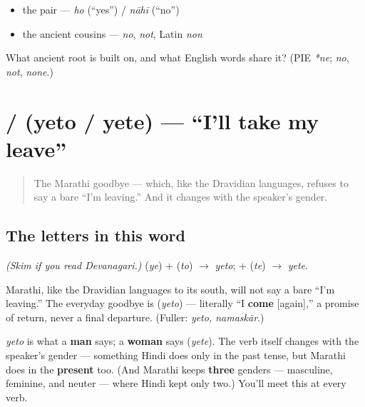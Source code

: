 \begin{itemize}
\raggedright
  \item the pair — \emph{ho} (\textquotedblleft{}yes\textquotedblright{}) / \emph{nāhī} (\textquotedblleft{}no\textquotedblright{})
  \item the ancient cousins — \emph{no}, \emph{not}, Latin \emph{non}
\end{itemize}

\begin{tcolorbox}[breakable,colback=teal!4,colframe=teal!35!black,title={Before you move on}]
What ancient root is \textbf{} built on, and what English words share it? (PIE \emph{*ne}; \emph{no}, \emph{not}, \emph{none}.)
\end{tcolorbox}
\section[yeto / yete]{ /  (yeto / yete) — \textquotedblleft{}I'll take my leave\textquotedblright{}}

\label{lesson:MR-C01-yeto}



\begin{quote}
The Marathi goodbye — which, like the Dravidian languages, refuses to say a bare \textquotedblleft{}I'm leaving.\textquotedblright{} And it changes with the speaker's gender.
\end{quote}

\subsection*{The letters in this word}
\emph{(Skim if you read Devanagari.)} \textbf{} (\emph{ye}) + \textbf{} (\emph{to}) $\to$ \emph{yeto}; \textbf{} + \textbf{} (\emph{te}) $\to$ \emph{yete}.

\begin{cousinweb}
Marathi, like the Dravidian languages to its south, will not say a bare \textquotedblleft{}I'm leaving.\textquotedblright{} The everyday goodbye is \textbf{} (\emph{yeto}) — literally \textquotedblleft{}I \textbf{come} {[}again{]},\textquotedblright{} a promise of return, never a final departure. (Fuller: \emph{yeto, namaskār}.)
\end{cousinweb}

\begin{grammarlens}[title={Grammar Lens: Marathi verbs carry gender}]
\emph{yeto} is what a \textbf{man} says; a \textbf{woman} says \textbf{} (\emph{yete}). The verb itself changes with the speaker's gender — something Hindi does only in the past tense, but Marathi does in the \textbf{present} too. (And Marathi keeps \textbf{three} genders — masculine, feminine, and neuter — where Hindi kept only two.) You'll meet this at every verb.
\end{grammarlens}

